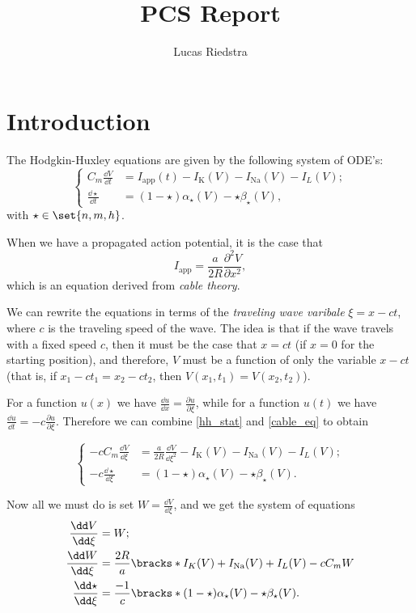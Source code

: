 \documentclass{article}
\title{PCS Report}
\author{Lucas Riedstra}
\theoremstyle{plain}
\theoremstyle{definition}
\theoremstyle{remark}
\newcommand{\Rm}{\mathrm}
\newcommand\app{\Rm{app}}
\newcommand\K{\Rm K}
\newcommand\Na{\Rm{Na}}
\newcommand\pt\partial
\begin{document}
\maketitle
\tableofcontents
\newpage

\section{Introduction}
The Hodgkin-Huxley equations are given by the following system of ODE's: 
\begin{equation} \label{hh_stat}
\begin{cases}
C_m \frac{\dd V}{\dd t} &= I_\app(t) - I_\K(V) - I_\Na(V) - I_L(V); \\
\frac{\dd \star}{\dd t} &= (1-\star)\alpha_\star(V) - \star\beta_\star(V), 
\end{cases}
\end{equation}
with $\star \in \set{n, m, h}$. 

When we have a propagated action potential, it is the case that
\begin{equation} \label{cable_eq}
I_\app = \frac{a}{2R} \frac{\pt^2 V}{\pt x^2}, 
\end{equation}
which is an equation derived from \emph{cable theory}. 


We can rewrite the equations in terms of the \emph{traveling wave varibale} $\xi = x - ct$, where $c$ is the traveling speed of the wave. The idea is that if the wave travels with a fixed speed $c$, then it must be the case that $x = ct$ (if $x=0$ for the starting position), and therefore, $V$ must be a function of only the variable $x - ct$ (that is, if $x_1 - c t_1 = x_2 - c t_2$, then $V(x_1, t_1) = V(x_2, t_2)$). 

For a function $u(x)$ we have $ \frac{\dd u}{\dd x} = \frac{\pt u}{\pt \xi}$, while for a function $u(t)$ we have $ \frac{\dd u}{\dd t} = -c \frac{\pt u}{\pt \xi}$. Therefore we can combine \eqref{hh_stat} and \eqref{cable_eq} to obtain

\begin{equation} \label{hh_dyn1}
\begin{cases}
-c C_m \frac{\dd V}{\dd \xi} &= \frac{a}{2R} \frac{\dd V}{\dd \xi^2} - I_\K(V) - I_\Na(V) - I_L(V); \\
-c \frac{\dd \star}{\dd \xi} &= (1-\star)\alpha_\star(V) - \star\beta_\star(V).
\end{cases}
\end{equation}

Now all we must do is set $W = \frac{\dd V}{\dd \xi}$, and we get the system of equations
\begin{align*}
\frac{\dd V}{\dd \xi} &= W;  \\
\frac{\dd W}{\dd \xi} &= \frac{2R}{a} \bracks*{I_K(V) + I_\Na(V) + I_L(V) - c C_m W} \\
\frac{\dd \star}{\dd \xi} &= \frac{-1}{c} \bracks*{(1-\star)\alpha_\star(V) - \star\beta_\star(V)}.
\end{align*}
\end{document}
